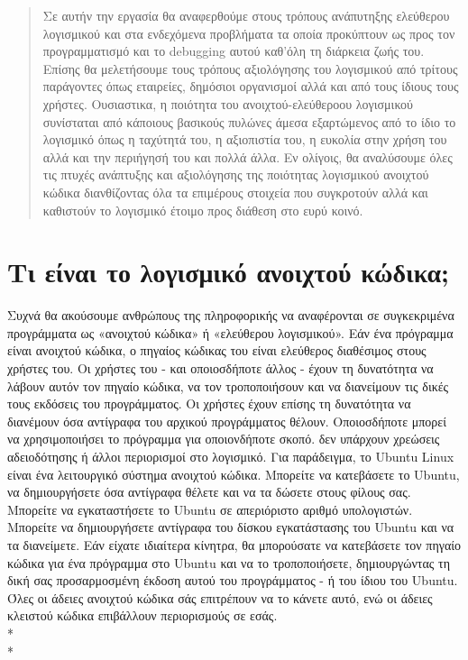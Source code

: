 \documentclass[a4paper, 11pt]{article}
\begin{document}
\tableofcontents

{\selectfont

\newpage

\begin{abstract}
Σε αυτήν την εργασία θα αναφερθούμε στους τρόπους ανάπυτηξης ελεύθερου λογισμικού
και στα ενδεχόμενα προβλήματα τα οποία προκύπτουν ως προς τον προγραμματισμό και το 
\textlatin{debugging} αυτού καθ'όλη τη διάρκεια ζωής του. Επίσης θα μελετήσουμε τους 
τρόπους αξιολόγησης του λογισμικού από τρίτους παράγοντες όπως εταιρείες, δημόσιοι οργανισμοί 
αλλά και από τους ίδιους τους χρήστες. Ουσιαστικα, η ποιότητα του ανοιχτού-ελεύθεροου λογισμικού 
συνίσταται από κάποιους βασικούς πυλώνες άμεσα εξαρτώμενος από το ίδιο το λογισμικό όπως η ταχύτητά
του, η αξιοπιστία του, η ευκολία στην χρήση του αλλά και την περιήγησή του και πολλά άλλα. Εν ολίγοις, 
θα αναλύσουμε όλες τις πτυχές ανάπτυξης και αξιολόγησης της ποιότητας λογισμικού ανοιχτού κώδικα 
διανθίζοντας όλα τα επιμέρους στοιχεία που συγκροτούν αλλά και καθιστούν το λογισμικό έτοιμο προς διάθεση 
στο ευρύ κοινό.
\end{abstract}

{\selectfont\section{Τι είναι το λογισμικό ανοιχτού κώδικα\textlatin{;}}}
 Συχνά θα ακούσουμε ανθρώπους της πληροφορικής να αναφέρονται σε συγκεκριμένα προγράμματα ως «ανοιχτού κώδικα» ή «ελεύθερου λογισμικού». Εάν ένα πρόγραμμα είναι ανοιχτού κώδικα, ο πηγαίος κώδικας του είναι ελεύθερος διαθέσιμος στους χρήστες του. Οι χρήστες του - και οποιοσδήποτε άλλος - έχουν τη δυνατότητα να λάβουν αυτόν τον πηγαίο κώδικα, να τον τροποποιήσουν και να διανείμουν τις δικές τους εκδόσεις του προγράμματος. Οι χρήστες έχουν επίσης τη δυνατότητα να διανέμουν όσα αντίγραφα του αρχικού προγράμματος θέλουν. Οποιοσδήποτε μπορεί να χρησιμοποιήσει το πρόγραμμα για οποιονδήποτε σκοπό. δεν υπάρχουν χρεώσεις αδειοδότησης ή άλλοι περιορισμοί στο λογισμικό. Για παράδειγμα, το \textlatin{Ubuntu Linux} είναι ένα λειτουργικό σύστημα ανοιχτού κώδικα. Μπορείτε να κατεβάσετε το \textlatin{Ubuntu}, να δημιουργήσετε όσα αντίγραφα θέλετε και να τα δώσετε στους φίλους σας. Μπορείτε να εγκαταστήσετε το \textlatin{Ubuntu} σε απεριόριστο αριθμό υπολογιστών. Μπορείτε να δημιουργήσετε αντίγραφα του δίσκου εγκατάστασης του \textlatin{Ubuntu} και να τα διανείμετε. Εάν είχατε ιδιαίτερα κίνητρα, θα μπορούσατε να κατεβάσετε τον πηγαίο κώδικα για ένα πρόγραμμα στο \textlatin{Ubuntu} και να το τροποποιήσετε, δημιουργώντας τη δική σας προσαρμοσμένη έκδοση αυτού του προγράμματος - ή του ίδιου του \textlatin{Ubuntu}. Όλες οι άδειες ανοιχτού κώδικα σάς επιτρέπουν να το κάνετε αυτό, ενώ οι άδειες κλειστού κώδικα επιβάλλουν περιορισμούς σε εσάς.\\*
\\*
}
\end{document}
